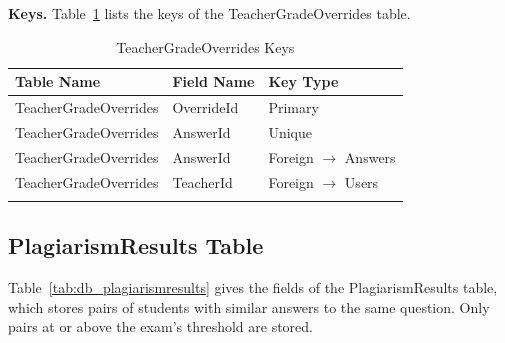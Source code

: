 \par\ifdim\dimexpr\pagegoal-\pagetotal\relax<200pt\newpage\fi
\noindent\textbf{Keys.} Table~\ref{tab:keys_teachergradeoverrides} lists the keys of the TeacherGradeOverrides table.

{\small
\begin{longtable}{>{\raggedright\arraybackslash}p{4.0cm}>{\raggedright\arraybackslash}p{4.6cm}>{\raggedright\arraybackslash}p{4.6cm}}
\caption{TeacherGradeOverrides Keys}\label{tab:keys_teachergradeoverrides}\\
\hline\hline
\textbf{Table Name} & \textbf{Field Name} & \textbf{Key Type} \\ \hline
\endfirsthead
\hline\hline
\endlastfoot
TeacherGradeOverrides & OverrideId & Primary \\*
TeacherGradeOverrides & AnswerId & Unique \\*
TeacherGradeOverrides & AnswerId & Foreign $\rightarrow$ Answers \\*
TeacherGradeOverrides & TeacherId & Foreign $\rightarrow$ Users \\*
\end{longtable}
}

\par\ifdim\dimexpr\pagegoal-\pagetotal\relax<376pt\newpage\fi
\subsection{PlagiarismResults Table}
Table~\ref{tab:db_plagiarismresults} gives the fields of the PlagiarismResults table, which stores pairs of students with similar answers to the same question. Only pairs at or above the exam's threshold are stored.

